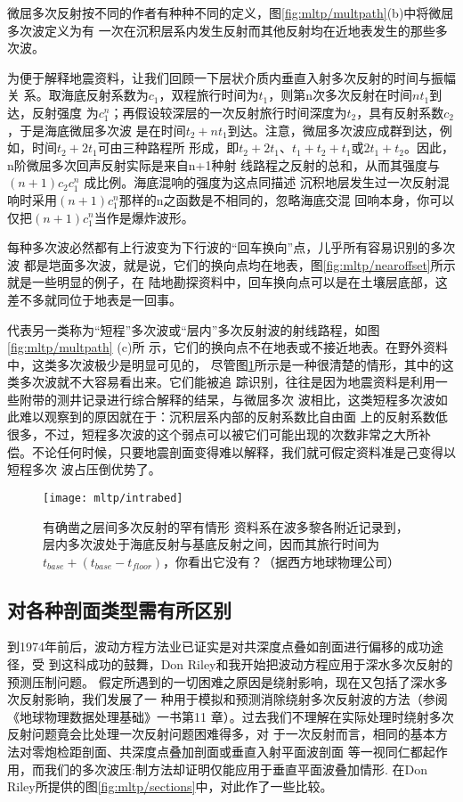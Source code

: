 微屈多次反射按不同的作者有种种不同的定义，图\ref{fig:mltp/multpath}(b)中将微屈多次波定义为有
一次在沉积层系内发生反射而其他反射均在近地表发生的那些多次波。

为便于解释地震资料，让我们回顾一下层状介质内垂直入射多次反射的时间与振幅关
系。取海底反射系数为$c_1$，双程旅行时间为$t_1$，则第n次多次反射在时间$nt_1$到达，反射强度
为$c_1^n$；再假设较深层的一次反射旅行时间深度为$t_2$，具有反射系数$c_2$，于是海底微屈多次波
是在时间$t_2+nt_1$到达。注意，微屈多次波应成群到达，例如，时间$t_2+2t_1$可由三种路程所
形成，即$t_2+2t_1$、$t_1+t_2+t_1$或$2t_1+t_2$。因此，n阶微屈多次回声反射实际是来自n+1种射
线路程之反射的总和，从而其强度与$(n+1)c_2c_1^n$
成比例。海底混响的强度为这点同描述
沉积地层发生过一次反射混响时采用$(n+1)c_1^n$那样的n之函数是不相同的，忽略海底交混
回响本身，你可以仅把$(n+1)c_1^n$当作是爆炸波形。

每种多次波必然都有上行波变为下行波的“回车换向”点，儿乎所有容易识别的多次波
都是垲面多次波，就是说，它们的换向点均在地表，图\ref{fig:mltp/nearoffset}所示就是一些明显的例子，在
陆地勘探资料中，回车换向点可以是在土壤层底部，这差不多就同位于地表是一回事。

代表另一类称为“短程”多次波或“层内”多次反射波的射线路程，如图\ref{fig:mltp/multpath}
(c)所
示，它们的换向点不在地表或不接近地表。在野外资料中，这类多次波极少是明显可见的，
尽管图\ref{fig:mltp/intrabed}所示是一种很清楚的情形，其中的这类多次波就不大容易看出来。它们能被追
踪识别，往往是因为地震资料是利用一些附带的测井记录进行综合解释的结杲，与微屈多次
波相比，这类短程多次波如此难以观察到的原因就在于：沉积层系内部的反射系数比自由面
上的反射系数低很多，不过，短程多次波的这个弱点可以被它们可能出现的次数非常之大所补
偿。不论任何时候，只要地震剖面变得难以解释，我们就可假定资料准是己变得以短程多次
波占压倒优势了。

\begin{figure}[H]
\centering
\texttt{[image: mltp/intrabed]}
\caption[intrabed]{
有确凿之层间多次反射的罕有情形
资料系在波多黎各附近记录到，层内多次波处于海底反射与基底反射之间，因而其旅行时间为
$t_{base}+(t_{base}-t_{floor})$，你看出它没有？（据西方地球物理公司）
}
\label{fig:mltp/intrabed}
\end{figure}

\subsection{对各种剖面类型需有所区别}
\label{sec:5.5.6}

到1974年前后，波动方程方法业已证实是对共深度点叠如剖面进行偏移的成功途径，受
到这科成功的鼓舞，Don
Riley和我开始把波动方程应用于深水多次反射的预测压制问题。
假定所遇到的一切困难之原因是绕射影响，现在又包括了深水多次反射影晌，我们发展了一
种用于模拟和预测消除绕射多次反射波的方法（参阅《地球物理数据处理基础》一书第11
章）。过去我们不理解在实际处理时绕射多次反射问题竟会比处理一次反射问题困难得多，对
于一次反射而言，相同的基本方法对零炮检距剖面、共深度点叠加剖面或垂直入射平面波剖面
等一视同仁都起作用，而我们的多次波压:制方法却证明仅能应用于垂直平面波叠加情形.
在Don
Riley所提供的图\ref{fig:mltp/sections}中，对此作了一些比较。


